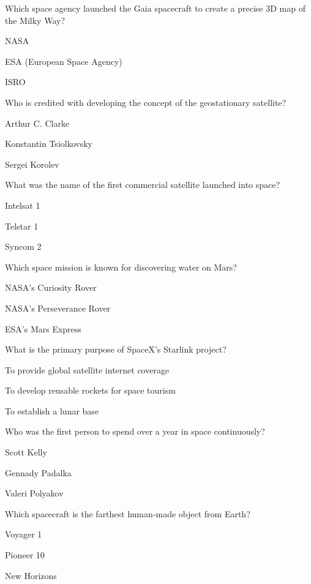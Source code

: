 \begin{enhancedmcq}{Which space agency launched the Gaia spacecraft to create a precise 3D map of the Milky Way?}
\item NASA
\item ESA (European Space Agency)
\item ISRO

\end{enhancedmcq}
\begin{enhancedmcq}{Who is credited with developing the concept of the geostationary satellite?}
\item Arthur C. Clarke
\item Konstantin Tsiolkovsky
\item Sergei Korolev

\end{enhancedmcq}
\begin{enhancedmcq}{What was the name of the first commercial satellite launched into space?}
\item Intelsat 1
\item Telstar 1
\item Syncom 2

\end{enhancedmcq}
\begin{enhancedmcq}{Which space mission is known for discovering water on Mars?}
\item NASA's Curiosity Rover
\item NASA's Perseverance Rover
\item ESA's Mars Express

\end{enhancedmcq}
\begin{enhancedmcq}{What is the primary purpose of SpaceX's Starlink project?}
\item To provide global satellite internet coverage
\item To develop reusable rockets for space tourism
\item To establish a lunar base

\end{enhancedmcq}
\begin{enhancedmcq}{Who was the first person to spend over a year in space continuously?}
\item Scott Kelly
\item Gennady Padalka
\item Valeri Polyakov

\end{enhancedmcq}
\begin{enhancedmcq}{Which spacecraft is the farthest human‑made object from Earth?}
\item Voyager 1
\item Pioneer 10
\item New Horizons

\end{enhancedmcq}
